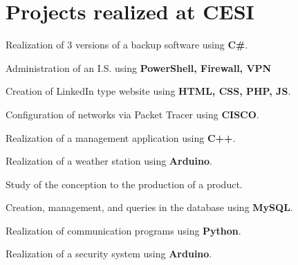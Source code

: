 \documentclass[a4paper,table]{twentysecondcv}
\begin{document}
\section{Projects realized at CESI}

\vspace{-0.2cm}
\begin{twenty}

{}
{Realization of 3 versions of a backup software using \textbf{C#}.}

{}
{Administration of an I.S. using \textbf{PowerShell, Firewall, VPN}}

{}
{Creation of LinkedIn type website using \textbf{HTML, CSS, PHP, JS}.}

{}
{Configuration of networks via Packet Tracer using \textbf{CISCO}.}

{}
{Realization of a management application using \textbf{C++}.}

{}
{Realization of a weather station using \textbf{Arduino}.}

{}
{Study of the conception to the production of a product.}

{}
{Creation, management, and queries in the database using \textbf{MySQL}.}

{}
{Realization of communication programs using \textbf{Python}.}

{}
{Realization of a security system using \textbf{Arduino}.}

\end{twenty}
\end{document}
